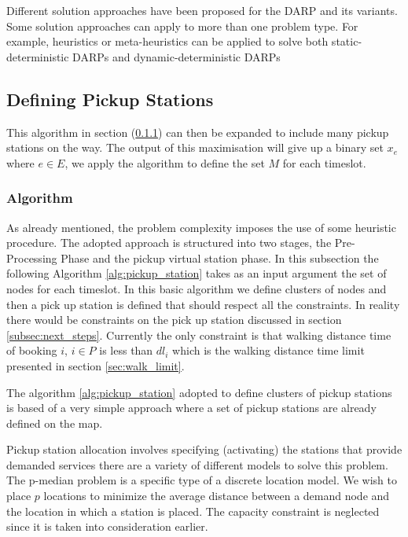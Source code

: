 \documentclass{article}
\begin{document}
Different solution approaches have been proposed for the DARP and its variants. Some solution approaches can apply to more than one problem type. 
For example, heuristics or meta-heuristics can be applied to solve both static-deterministic DARPs and dynamic-deterministic DARPs

\subsection{Defining Pickup Stations}
\label{subsec:definepickup}


This algorithm in section (\ref{subsec:alg}) can then be expanded to include many pickup stations on the way. The output of this maximisation will give up a binary set $x_e$ where $e \in E$, we apply the algorithm to define the set $M$ for each timeslot.

\subsubsection{Algorithm}
\label{subsec:alg}
As already mentioned, the problem complexity imposes the use of some heuristic procedure. The adopted approach is structured into two stages, the Pre-Processing Phase
and the pickup virtual station phase. In this subsection the following Algorithm \ref{alg:pickup_station} takes as an input argument the set of nodes for each timeslot. %
In this basic algorithm we define clusters of nodes and then a pick up station is defined that should respect all the constraints. In reality there would be constraints on the pick up station discussed in section \ref{subsec:next_steps}. Currently the only constraint 
is that walking distance time of booking $i$, $i \in P$  is less than $dl_i$ which is the walking distance time limit presented in section \ref{sec:walk_limit}.

The algorithm \ref{alg:pickup_station} adopted to define clusters of pickup stations is based of a very simple approach where a set of pickup stations are already defined on the map. 

Pickup station allocation involves specifying (activating) the stations that provide demanded services there are a variety of different models to solve
this problem.
The p-median problem is a specific type of a discrete location model. We wish to place $p$ locations to minimize the average distance between a demand
node and the location in which a station is placed. The capacity constraint is neglected since it is taken into consideration earlier.
\end{document}
